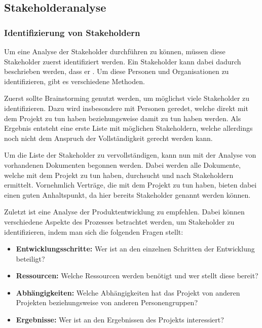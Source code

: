 \subsection{Stakeholderanalyse}\label{sec:stakeholderanalyse-teil-1}
\subsubsection{Identifizierung von Stakeholdern}
Um eine Analyse der Stakeholder durchführen zu können, müssen diese Stakeholder zuerst identifiziert werden.
Ein Stakeholder kann dabei dadurch beschrieben werden, dass er \autocite[S. 8]{Maulhardt.a}.
Um diese Personen und Organisationen zu identifizieren, gibt es verschiedene Methoden.

Zuerst sollte Brainstorming genutzt werden, um möglichst viele Stakeholder zu identifizieren.
Dazu wird insbesondere mit Personen geredet, welche direkt mit dem Projekt zu tun haben beziehungsweise damit zu tun haben werden.
Als Ergebnis entsteht eine erste Liste mit möglichen Stakeholdern, welche allerdings noch nicht dem Anspruch der Vollständigkeit gerecht werden kann.

Um die Liste der Stakeholder zu vervollständigen, kann nun mit der Analyse von vorhandenen Dokumenten begonnen werden.
Dabei werden alle Dokumente, welche mit dem Projekt zu tun haben, durchsucht und nach Stakeholdern ermittelt.
Vornehmlich Verträge, die mit dem Projekt zu tun haben, bieten dabei einen guten Anhaltspunkt, da hier bereits Stakeholder genannt werden können.

Zuletzt ist eine Analyse der Produktentwicklung zu empfehlen.
Dabei können verschiedene Aspekte des Prozesses betrachtet werden, um Stakeholder zu identifizieren, indem man sich die folgenden Fragen stellt:

\begin{itemize}
    \item \textbf{Entwicklungsschritte:} Wer ist an den einzelnen Schritten der Entwicklung beteiligt?
    \item \textbf{Ressourcen:} Welche Ressourcen werden benötigt und wer stellt diese bereit?
    \item \textbf{Abhängigkeiten:} Welche Abhängigkeiten hat das Projekt von anderen Projekten beziehungsweise von anderen Personengruppen?
    \item \textbf{Ergebnisse:} Wer ist an den Ergebnissen des Projekts interessiert?
\end{itemize}

